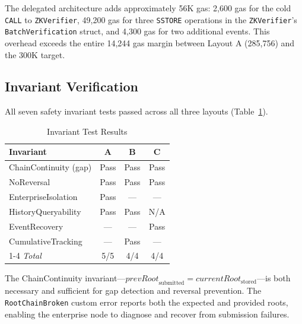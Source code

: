 The delegated architecture adds approximately 56K gas: 2,600 gas for the cold
\texttt{CALL} to \texttt{ZKVerifier}, 49,200 gas for three \texttt{SSTORE} operations in
the \texttt{ZKVerifier}'s \texttt{BatchVerification} struct, and 4,300 gas for two
additional events. This overhead exceeds the entire 14,244 gas margin between Layout A
(285,756) and the 300K target.

\subsection{Invariant Verification}

All seven safety invariant tests passed across all three layouts (Table~\ref{tab:invariants}).

\begin{table}[htbp]
\centering
\caption{Invariant Test Results}
\label{tab:invariants}
\small
\begin{tabular}{@{}lccc@{}}
\toprule
\textbf{Invariant} & \textbf{A} & \textbf{B} & \textbf{C} \\
\midrule
ChainContinuity (gap)     & Pass & Pass & Pass \\
NoReversal                & Pass & Pass & Pass \\
EnterpriseIsolation       & Pass & ---  & ---  \\
HistoryQueryability       & Pass & Pass & N/A  \\
EventRecovery             & ---  & ---  & Pass \\
CumulativeTracking        & ---  & Pass & ---  \\
\cmidrule{1-4}
\textit{Total}            & 5/5  & 4/4  & 4/4  \\
\bottomrule
\end{tabular}
\end{table}

The ChainContinuity invariant---$\mathit{prevRoot}_{\text{submitted}} =
\mathit{currentRoot}_{\text{stored}}$---is both necessary and sufficient for gap detection
and reversal prevention. The \texttt{RootChainBroken} custom error reports both the expected
and provided roots, enabling the enterprise node to diagnose and recover from submission
failures.

